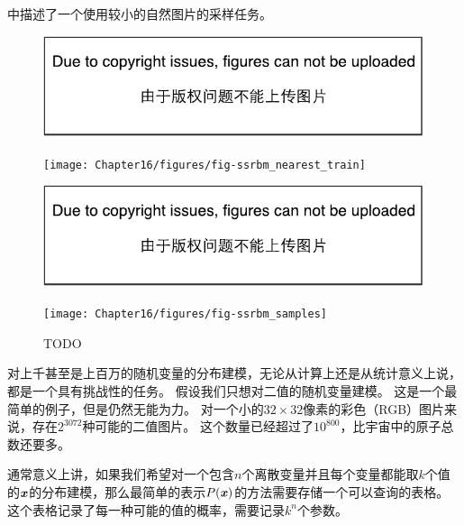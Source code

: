 中描述了一个使用较小的自然图片的采样任务。

\begin{figure}[!htb]
\ifOpenSource
\centerline{\includegraphics{figure.pdf}}
\else
	\centerline{\texttt{[image: Chapter16/figures/fig-ssrbm\_nearest\_train]}}
\fi
\ifOpenSource
\centerline{\includegraphics{figure.pdf}}
\else
	\centerline{\texttt{[image: Chapter16/figures/fig-ssrbm\_samples]}}	
\fi
	\caption{TODO}
	\label{fig:chap16_fig-ssrbm}
\end{figure}

对上千甚至是上百万的随机变量的分布建模，无论从计算上还是从统计意义上说，都是一个具有挑战性的任务。
假设我们只想对二值的随机变量建模。
这是一个最简单的例子，但是仍然无能为力。
对一个小的$32\times 32$像素的彩色（RGB）图片来说，存在$2^{3072}$种可能的二值图片。
这个数量已经超过了$10^{800}$，比宇宙中的原子总数还要多。

通常意义上讲，如果我们希望对一个包含$n$个离散变量并且每个变量都能取$k$个值的$\boldsymbol{\mathit{x}}$的分布建模，那么最简单的表示$P(\boldsymbol{\mathit{x}})$的方法需要存储一个可以查询的表格。
这个表格记录了每一种可能的值的概率，需要记录$k^n$个参数。

